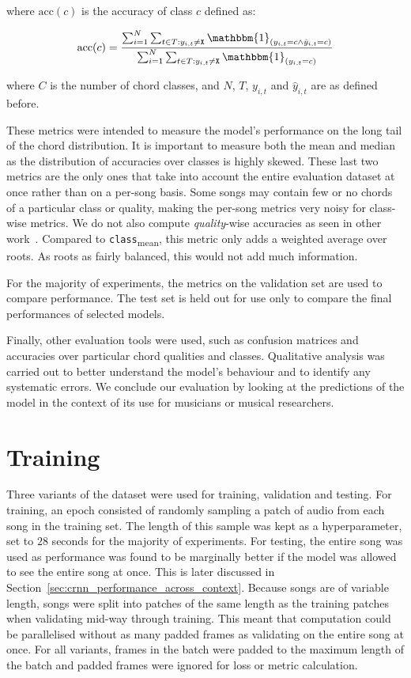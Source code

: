 where $\text{acc}(c)$ is the accuracy of class $c$ defined as:

\[\text{acc}(c) = \frac{\sum_{i=1}^{N} \sum_{t\in T : y_{i,t} \neq \texttt{X}} \mathbbm{1}_{(y_{i,t} = c \land \hat{y}_{i,t} = c)}}{\sum_{i=1}^{N} \sum_{t\in T : y_{i,t} \neq \texttt{X}} \mathbbm{1}_{(y_{i,t} = c)}}\]

where $C$ is the number of chord classes, and $N$, $T$, $y_{i,t}$ and $\hat{y}_{i,t}$ are as defined before.

These metrics were intended to measure the model's performance on the long tail of the chord distribution. It is important to measure both the mean and median as the distribution of accuracies over classes is highly skewed. These last two metrics are the only ones that take into account the entire evaluation dataset at once rather than on a per-song basis. Some songs may contain few or no chords of a particular class or quality, making the per-song metrics very noisy for class-wise metrics. We do not also compute \emph{quality}-wise accuracies as seen in other work~\citep{CurriculumLearning}. Compared to \texttt{class}\textsubscript{mean}, this metric only adds a weighted average over roots. As roots as fairly balanced, this would not add much information.

For the majority of experiments, the metrics on the validation set are used to compare performance. The test set is held out for use only to compare the final performances of selected models.

Finally, other evaluation tools were used, such as confusion matrices and accuracies over particular chord qualities and classes. Qualitative analysis was carried out to better understand the model's behaviour and to identify any systematic errors. We conclude our evaluation by looking at the predictions of the model in the context of its use for musicians or musical researchers. 

\section{Training}\label{sec:training}

Three variants of the dataset were used for training, validation and testing. For training, an epoch consisted of randomly sampling a patch of audio from each song in the training set. The length of this sample was kept as a hyperparameter, set to $28$ seconds for the majority of experiments. For testing, the entire song was used as performance was found to be marginally better if the model was allowed to see the entire song at once. This is later discussed in Section~\ref{sec:crnn_performance_across_context}. Because songs are of variable length, songs were split into patches of the same length as the training patches when validating mid-way through training. This meant that computation could be parallelised without as many padded frames as validating on the entire song at once. For all variants, frames in the batch were padded to the maximum length of the batch and padded frames were ignored for loss or metric calculation.

